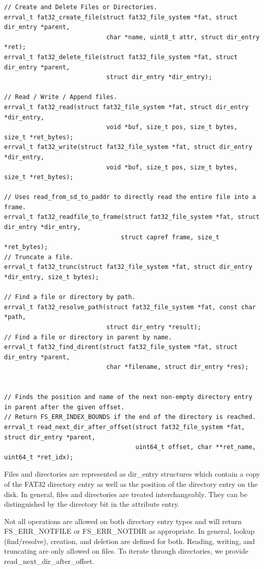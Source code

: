 \begin{verbatim}
// Create and Delete Files or Directories.
errval_t fat32_create_file(struct fat32_file_system *fat, struct dir_entry *parent,
                            char *name, uint8_t attr, struct dir_entry *ret);
errval_t fat32_delete_file(struct fat32_file_system *fat, struct dir_entry *parent, 
                            struct dir_entry *dir_entry);

// Read / Write / Append files.
errval_t fat32_read(struct fat32_file_system *fat, struct dir_entry *dir_entry,
                            void *buf, size_t pos, size_t bytes, size_t *ret_bytes);
errval_t fat32_write(struct fat32_file_system *fat, struct dir_entry *dir_entry,
                            void *buf, size_t pos, size_t bytes, size_t *ret_bytes);

// Uses read_from_sd_to_paddr to directly read the entire file into a frame.
errval_t fat32_readfile_to_frame(struct fat32_file_system *fat, struct dir_entry *dir_entry,
                                struct capref frame, size_t *ret_bytes); 
// Truncate a file.
errval_t fat32_trunc(struct fat32_file_system *fat, struct dir_entry *dir_entry, size_t bytes);

// Find a file or directory by path.
errval_t fat32_resolve_path(struct fat32_file_system *fat, const char *path,
                            struct dir_entry *result);
// Find a file or directory in parent by name.
errval_t fat32_find_dirent(struct fat32_file_system *fat, struct dir_entry *parent,
                            char *filename, struct dir_entry *res);


// Finds the position and name of the next non-empty directory entry in parent after the given offset.
// Return FS_ERR_INDEX_BOUNDS if the end of the directory is reached.
errval_t read_next_dir_after_offset(struct fat32_file_system *fat, struct dir_entry *parent,
                                    uint64_t offset, char **ret_name, uint64_t *ret_idx);
\end{verbatim}

Files and directories are represented as dir\_entry structures which contain a copy of the FAT32 directory entry as well as the position of the directory entry on the disk.
In general, files and directories are treated interchangeably. 
They can be distinguished by the directory bit in the attribute entry.

Not all operations are allowed on both directory entry types and will return FS\_ERR\_NOTFILE or FS\_ERR\_NOTDIR as appropriate.
In general, lookup (find/resolve), creation, and deletion are defined for both.
Reading, writing, and truncating are only allowed on files.
To iterate through directories, we provide read\_next\_dir\_after\_offset.

